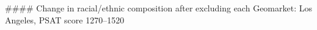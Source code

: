 #### Change in racial/ethnic composition after excluding each Geomarket: Los Angeles, PSAT score 1270–1520
